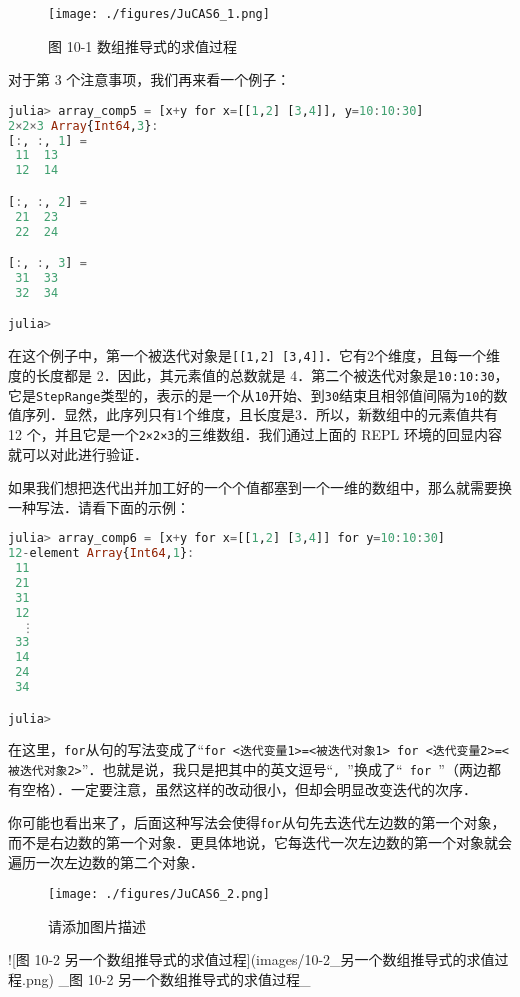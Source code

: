 \begin{figure}[ht]
\centering
\texttt{[image: ./figures/JuCAS6\_1.png]}
\caption{图 10-1 数组推导式的求值过程} \label{JuCAS6_fig1}
\end{figure}

对于第 3 个注意事项，我们再来看一个例子：

\begin{lstlisting}[language=julia]
julia> array_comp5 = [x+y for x=[[1,2] [3,4]], y=10:10:30]
2×2×3 Array{Int64,3}:
[:, :, 1] =
 11  13
 12  14

[:, :, 2] =
 21  23
 22  24

[:, :, 3] =
 31  33
 32  34

julia> 
\end{lstlisting}

在这个例子中，第一个被迭代对象是\verb|[[1,2] [3,4]]|．它有2个维度，且每一个维度的长度都是 2．因此，其元素值的总数就是 4．第二个被迭代对象是\verb|10:10:30|，它是\verb|StepRange|类型的，表示的是一个从\verb|10|开始、到\verb|30|结束且相邻值间隔为\verb|10|的数值序列．显然，此序列只有1个维度，且长度是3．所以，新数组中的元素值共有 12 个，并且它是一个\verb|2×2×3|的三维数组．我们通过上面的 REPL 环境的回显内容就可以对此进行验证．

如果我们想把迭代出并加工好的一个个值都塞到一个一维的数组中，那么就需要换一种写法．请看下面的示例：

\begin{lstlisting}[language=julia]
julia> array_comp6 = [x+y for x=[[1,2] [3,4]] for y=10:10:30]
12-element Array{Int64,1}:
 11
 21
 31
 12
  ⋮
 33
 14
 24
 34

julia> 
\end{lstlisting}

在这里，\verb|for|从句的写法变成了“\verb|for <迭代变量1>=<被迭代对象1> for <迭代变量2>=<被迭代对象2>|”．也就是说，我只是把其中的英文逗号“\verb|, |”换成了“\verb| for |”（两边都有空格）．一定要注意，虽然这样的改动很小，但却会明显改变迭代的次序．

你可能也看出来了，后面这种写法会使得\verb|for|从句先去迭代左边数的第一个对象，而不是右边数的第一个对象．更具体地说，它每迭代一次左边数的第一个对象就会遍历一次左边数的第二个对象．

\begin{figure}[ht]
\centering
\texttt{[image: ./figures/JuCAS6\_2.png]}
\caption{请添加图片描述} \label{JuCAS6_fig2}
\end{figure}

![图 10-2 另一个数组推导式的求值过程](images/10-2_另一个数组推导式的求值过程.png)
_图 10-2 另一个数组推导式的求值过程_

